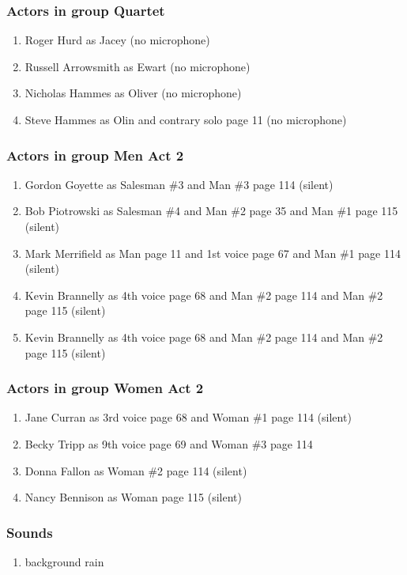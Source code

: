 \subsubsection{Actors in group Quartet}
\begin{enumerate}
\item Roger Hurd as Jacey (no microphone)
\item Russell Arrowsmith as Ewart (no microphone)
\item Nicholas Hammes as Oliver (no microphone)
\item Steve Hammes as Olin and contrary solo page 11 (no microphone)
\end{enumerate}
\subsubsection{Actors in group Men Act 2}
\begin{enumerate}
\item Gordon Goyette as Salesman \#3 and Man \#3 page 114 (silent)
\item Bob Piotrowski as Salesman \#4 and Man \#2 page 35 and Man \#1 page 115 (silent)
\item Mark Merrifield as Man page 11 and 1st voice page 67 and Man \#1 page 114 (silent)
\item Kevin Brannelly as 4th voice page 68 and Man \#2 page 114 and Man \#2 page 115 (silent)
\item Kevin Brannelly as 4th voice page 68 and Man \#2 page 114 and Man \#2 page 115 (silent)
\end{enumerate}
\subsubsection{Actors in group Women Act 2}
\begin{enumerate}
\item Jane Curran as 3rd voice page 68 and Woman \#1 page 114 (silent)
\item Becky Tripp as 9th voice page 69 and Woman \#3 page 114
\item Donna Fallon as Woman \#2 page 114 (silent)
\item Nancy Bennison as Woman page 115 (silent)
\end{enumerate}

\subsubsection{Sounds}
\begin{enumerate}
\item background rain
\end{enumerate}
